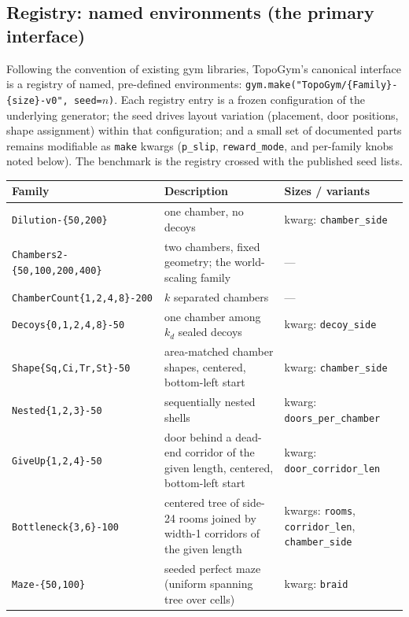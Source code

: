 \documentclass[11pt]{article}
\begin{document}
\subsection{Registry: named environments (the primary interface)}
\label{sec:registry}

Following the convention of existing gym libraries, TopoGym's
canonical interface is a registry of named, pre-defined environments:
\texttt{gym.make("TopoGym/\{Family\}-\{size\}-v0", seed=$n$)}. Each
registry entry is a frozen configuration of the underlying generator;
the seed drives layout variation (placement, door positions, shape
assignment) within that configuration; and a small set of documented
parts remains modifiable as \texttt{make} kwargs (\texttt{p\_slip},
\texttt{reward\_mode}, and per-family knobs noted below). The
benchmark is the registry crossed with the published seed lists.

\begin{center}
\small
\begin{tabular}{@{}>{\raggedright\arraybackslash}p{4.6cm}
                >{\raggedright\arraybackslash}p{5.6cm}
                >{\raggedright\arraybackslash}p{3.6cm}@{}}
\toprule
\textbf{Family} & \textbf{Description} & \textbf{Sizes / variants} \\
\midrule
\texttt{Dilution-\{50,200\}} &
  one chamber, no decoys & kwarg: \texttt{chamber\_side} \\
\texttt{Chambers2-\{50,100,200,400\}} &
  two chambers, fixed geometry; the world-scaling family & --- \\
\texttt{ChamberCount\{1,2,4,8\}-200} &
  $k$ separated chambers & --- \\
\texttt{Decoys\{0,1,2,4,8\}-50} &
  one chamber among $k_d$ sealed decoys & kwarg: \texttt{decoy\_side} \\
\texttt{Shape\{Sq,Ci,Tr,St\}-50} &
  area-matched chamber shapes, centered, bottom-left start &
  kwarg: \texttt{chamber\_side} \\
\texttt{Nested\{1,2,3\}-50} &
  sequentially nested shells &
  kwarg: \texttt{doors\_per\_chamber} \\
\texttt{GiveUp\{1,2,4\}-50} &
  door behind a dead-end corridor of the given length, centered,
  bottom-left start & kwarg: \texttt{door\_corridor\_len} \\
\texttt{Bottleneck\{3,6\}-100} &
  centered tree of side-24 rooms joined by width-1 corridors of the
  given length &
  kwargs: \texttt{rooms}, \texttt{corridor\_len},
  \texttt{chamber\_side} \\
\texttt{Maze-\{50,100\}} &
  seeded perfect maze (uniform spanning tree over cells) &
  kwarg: \texttt{braid} \\
\bottomrule
\end{tabular}
\end{center}
\end{document}
